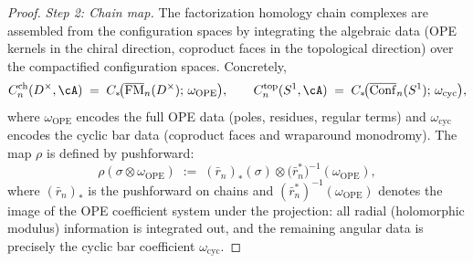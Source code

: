 \begin{proof}
\medskip
\noindent\textit{Step 2: Chain map.}
The factorization homology chain complexes are assembled
from the configuration spaces by integrating the
algebraic data (OPE kernels in the chiral direction,
coproduct faces in the topological direction) over the
compactified configuration spaces.
Concretely,
\[
 C^{\mathrm{ch}}_n(D^\times,\cA)
 \;=\;
 C_\ast\!\bigl(\overline{\mathrm{FM}}_n(D^\times);\,
 \omega_{\mathrm{OPE}}\bigr),
 \qquad
 C^{\mathrm{top}}_n(S^1,\cA)
 \;=\;
 C_\ast\!\bigl(\overline{\mathrm{Conf}}_n(S^1);\,
 \omega_{\mathrm{cyc}}\bigr),
\]
where $\omega_{\mathrm{OPE}}$ encodes the full OPE data
(poles, residues, regular terms) and
$\omega_{\mathrm{cyc}}$ encodes the cyclic bar data
(coproduct faces and wraparound monodromy).
The map $\rho$ is defined by pushforward:
\begin{equation}\label{eq:rho-pushforward}
 \rho(\sigma\otimes\omega_{\mathrm{OPE}})
 \;:=\;
 (\bar r_n)_\ast(\sigma)\otimes
 \bigl(\bar r_n^\ast\bigr)^{-1}(\omega_{\mathrm{OPE}}),
\end{equation}
where $(\bar r_n)_\ast$ is the pushforward on chains
and $(\bar r_n^\ast)^{-1}(\omega_{\mathrm{OPE}})$ denotes
the image of the OPE coefficient system under the
projection: all radial (holomorphic modulus) information
is integrated out, and the remaining angular data is
precisely the cyclic bar coefficient $\omega_{\mathrm{cyc}}$.


\end{proof}
